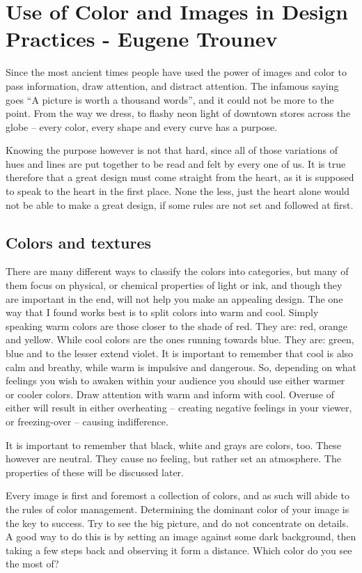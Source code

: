 \chapter{Use of Color and Images in Design Practices - Eugene Trounev}
Since the most ancient times people have used the power of images and color to
pass information, draw attention, and distract attention. The infamous
saying goes ``A picture is worth a thousand words'', and it could not be more to
the point. From the way we dress, to flashy neon light of downtown stores across
the globe -- every color, every shape and every curve has a purpose.

Knowing the purpose however is not that hard, since all of those variations of
hues and lines are put together to be read and felt by every one of us. It is
true therefore that a great design must come straight from the heart, as it is
supposed to speak to the heart in the first place. None the less, just the heart
alone would not be able to make a great design, if some rules are not set and
followed at first.

\section*{Colors and textures}

There are many different ways to classify the colors into categories, but many of
them focus on physical, or chemical properties of light or ink, and though they are
important in the end, will not help you make an appealing design. The one way
that I found works best is to split colors into warm and cool. Simply speaking
warm colors are those closer to the shade of red. They are: red, orange and
yellow. While cool colors are the ones running towards blue. They are: green,
blue and to the lesser extend violet. It is important to remember that cool is
also calm and breathy, while warm is impulsive and dangerous. So, depending on
what feelings you wish to awaken within your audience you should use either
warmer or cooler colors. Draw attention with warm and inform with cool.
Overuse of either will result in either overheating -- creating negative feelings
in your viewer, or freezing-over -- causing indifference.

It is important to remember that black, white and grays are colors, too. These
however are neutral. They cause no feeling, but rather set an atmosphere. The
properties of these will be discussed later.

Every image is first and foremost a collection of colors, and as such will abide
to the rules of color management. Determining the dominant color of your image is
the key to success. Try to see the big picture, and do not concentrate on
details. A good way to do this is by setting an image against some dark
background, then taking a few steps back and observing it form a distance. Which
color do you see the most of?

